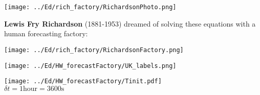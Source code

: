 \begin{slide}{}

\begin{minipage}{0.38\linewidth}
\texttt{[image: ../Ed/rich\_factory/RichardsonPhoto.png]}
\end{minipage}
\hfill
\begin{minipage}{0.58\linewidth}
{\large\bf Lewis Fry Richardson} (1881-1953)
dreamed of solving these equations with a human forecasting factory:

\texttt{[image: ../Ed/rich\_factory/RichardsonFactory.png]}

\end{minipage}

\end{slide}

\begin{slide}{}

\begin{minipage}[t]{0.65\linewidth}
    \texttt{[image: ../Ed/HW\_forecastFactory/UK\_labels.png]}
\end{minipage}
\begin{minipage}[t]{0.35\linewidth}
    \texttt{[image: ../Ed/HW\_forecastFactory/Tinit.pdf]}\\
    $\delta t = 1\text{hour} = 3600\text{s}$
\end{minipage}
\end{slide}


